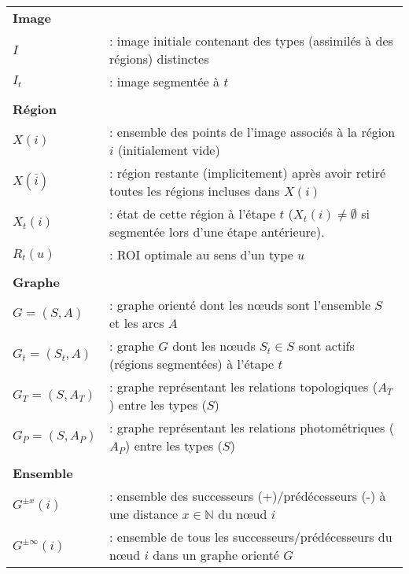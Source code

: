 \begin{center}
\begin{tabular}{ l l }
\\\textbf{Image} \\
	$I$		& : image initiale contenant des types (assimilés à des régions) distinctes \\
	$I_t$		& : image segmentée à $t$ \\
\\\textbf{Région} \\
	$X(i)$ 		& : ensemble des points de l'image associés à la région $i$ (initialement vide) \\
	$X(\bar{i})$ 	& : région restante (implicitement) après avoir retiré toutes les régions incluses dans $X(i)$ \\
	$X_t(i)$ 	& : état de cette région à l'étape $t$ ($X_t(i)\ne \emptyset$ si segmentée lors d'une étape antérieure). \\
	$R_t(u)$ 	& : ROI optimale au sens \citep[Fasquel]{Fasquel2006} d'un type $u$\\
\\\textbf{Graphe}\\
	$G=(S,A)$ 	& : graphe orienté dont les n\oe{}uds sont l'ensemble $S$ et les arcs $A$ \\
	$G_t=(S_t,A)$	& : graphe $G$ dont les n\oe{}uds $S_t\in S$ sont actifs (régions segmentées) à l'étape $t$ \\
	$G_T=(S,A_T)$	& : graphe représentant les relations topologiques ($A_T$) entre les types ($S$) \\
	$G_P=(S,A_P)$	& : graphe représentant les relations photométriques ($A_P$) entre les types ($S$) \\
\\\textbf{Ensemble}\\
	$G^{\pm x}(i)$	& : ensemble des successeurs (+)/prédécesseurs (-) à une distance $x\in \mathbb{N}$ du n\oe{}ud $i$ \\
	$G^{\pm \infty}(i)$& : ensemble de tous les successeurs/prédécesseurs du n\oe{}ud $i$ dans un graphe orienté $G$ \\



\end{tabular}
\end{center}
